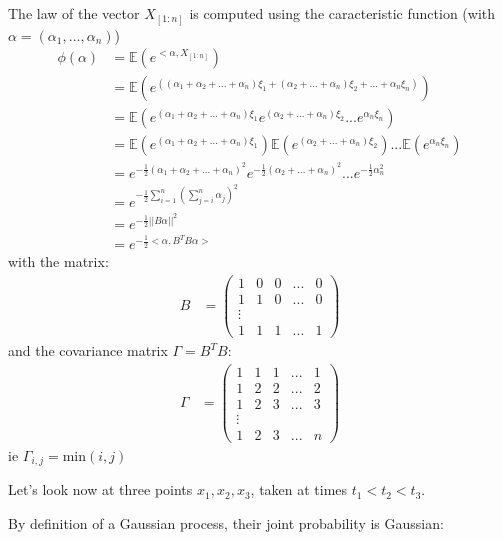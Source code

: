 {The law of the vector $X_{[1:n]}$ is computed using the caracteristic function (with $\alpha = (\alpha_1,...,\alpha_n)$)
\begin{align}
    \phi(\alpha) &= \mathbb{E}(e^{<\alpha, X_{[1:n]}}) \\
    &= \mathbb{E}(e^{((\alpha_1 + \alpha_2 + ... + \alpha_n)\xi_1 + (\alpha_2 + ... + \alpha_n)\xi_2 + ... + \alpha_n \xi_n)}) \\
    &= \mathbb{E}(e^{(\alpha_1 + \alpha_2 + ... + \alpha_n)\xi_1}e^{(\alpha_2 + ... + \alpha_n)\xi_2}...e^{\alpha_n\xi_n}) \\
    &= \mathbb{E}(e^{(\alpha_1 + \alpha_2 + ... + \alpha_n)\xi_1}) \mathbb{E}(e^{(\alpha_2 + ... + \alpha_n)\xi_2}) ... \mathbb{E}(e^{\alpha_n\xi_n}) \\
    &= e^{-\frac{1}{2}(\alpha_1 + \alpha_2 + ... + \alpha_n)^{2}} e^{-\frac{1}{2}(\alpha_2 + ... + \alpha_n)^{2}} ... e^{-\frac{1}{2}\alpha_n^{2}} \\
    &= e^{-\frac{1}{2}\sum_{i=1}^{n}(\sum_{j=i}^{n}\alpha_j)^{2}} \\
    &= e^{-\frac{1}{2}\vert\vert B \alpha \vert\vert ^{2}} \\
    &= e^{-\frac{1}{2} < \alpha, B^{T}B \alpha >}
\end{align}
with the matrix:
\begin{align}
    B &= \begin{pmatrix}
        1 & 0 & 0 & ... & 0 \\
        1 & 1 & 0 & ... & 0 \\
        \vdots \\
        1 & 1 & 1 & ... & 1
    \end{pmatrix}
\end{align}
and the covariance matrix $\Gamma = B^{T}B$:
\begin{align}
    \Gamma &= \begin{pmatrix}
        1 & 1 & 1 & ... & 1 \\
        1 & 2 & 2 & ... & 2 \\
        1 & 2 & 3 & ... & 3 \\
        \vdots \\
        1 & 2 & 3 & ... & n
    \end{pmatrix}
\end{align}
ie $\Gamma_{i,j} = \text{min}(i,j)$
}

Let's look now at three points $x_1, x_2, x_3$, taken at times $t_1 < t_2 < t_3$.

By definition of a Gaussian process, their joint probability is Gaussian:

